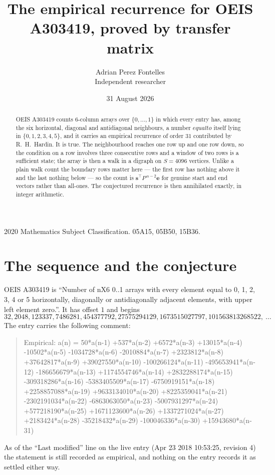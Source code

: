 \documentclass[11pt,a4paper]{article}
\title{The empirical recurrence for OEIS A303419, proved by transfer matrix}
\author{Adrian Perez Fontelles\\ \small Independent researcher}
\date{31 August 2026}
\theoremstyle{plain}
\theoremstyle{definition}
\begin{document}
\maketitle

\begin{abstract}
OEIS A303419 counts $6$-column arrays over $\{0,\dots,1\}$ in which every entry has,
among the six horizontal, diagonal and antidiagonal neighbours, a number $equal to$ itself lying in $\{0,1,2,3,4,5\}$, and it carries an empirical
recurrence of order $31$ contributed by R.~H.~Hardin. It is true. The neighbourhood
reaches one row up and one row down, so the condition on a row involves three consecutive
rows and a window of two rows is a sufficient state; the array is then a walk in a digraph
on $S=4096$ vertices. Unlike a plain walk count the boundary rows matter here --- the first
row has nothing above it and the last nothing below --- so the count is
$\mathbf{s}^{\!\top}P^{\,n-2}\mathbf{e}$ for genuine start and end vectors rather than
all-ones. The conjectured recurrence is then annihilated exactly, in integer arithmetic.
\end{abstract}

\noindent\small 2020 Mathematics Subject Classification. 05A15, 05B50, 15B36.\normalsize

\section{The sequence and the conjecture}

OEIS A303419 is ``Number of nX6 0..1 arrays with every element equal to 0, 1, 2, 3, 4 or 5 horizontally, diagonally or antidiagonally adjacent elements, with upper left element zero.''. It has offset
$1$ and begins
\[
32, 2048, 123337, 7486281, 454377792, 27575294129, 1673515027797, 101563813268522,\ \dots
\]
The entry carries the following comment:
\begin{quote}\small
Empirical: a(n) = 50*a(n-1) +537*a(n-2) +6572*a(n-3) +13015*a(n-4) -10502*a(n-5) -1034728*a(n-6) -2010884*a(n-7) +2323812*a(n-8) +37642817*a(n-9) +39027550*a(n-10) -100266124*a(n-11) -495653941*a(n-12) -186656679*a(n-13) +1174554746*a(n-14) +2832288174*a(n-15) -309318286*a(n-16) -5383405509*a(n-17) -6750919151*a(n-18) +2258857088*a(n-19) +9633134010*a(n-20) +8225359041*a(n-21) -2302191034*a(n-22) -6863063050*a(n-23) -5007931297*a(n-24) +577218190*a(n-25) +1671123600*a(n-26) +1337271024*a(n-27) +2183424*a(n-28) -35218432*a(n-29) -100046336*a(n-30) +15943680*a(n-31)
\end{quote}
As of the ``Last modified'' line on the live entry (Apr 23 2018 10:53:25, revision
4) the statement is still recorded as empirical, and nothing on the entry
records it as settled either way.
\end{document}
